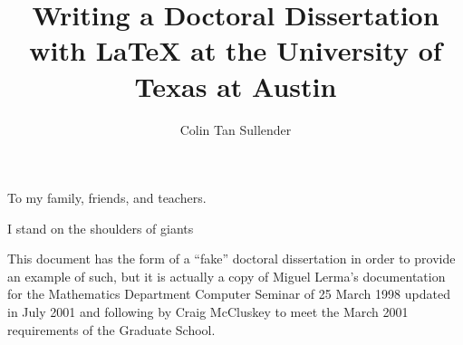 \documentclass[12pt]{report}
\author{Colin Tan Sullender}
\title{Writing a Doctoral Dissertation with \LaTeX{} at the University of Texas at Austin}
\begin{document}
\copyrightpage      %
\commcertpage       %
\titlepage          %


\begin{dedication}
To my family, friends, and teachers.
\end{dedication}


\begin{acknowledgments}
I stand on the shoulders of giants
\end{acknowledgments}


\utabstract
\indent
This document has the form of a ``fake'' doctoral dissertation in order to provide an example of such, but it is actually a
copy of Miguel Lerma's documentation for the Mathematics Department Computer Seminar of 25 March 1998 updated in July 2001
and following by Craig McCluskey to meet the March 2001 requirements of the Graduate School.


\tableofcontents
\listoftables
\listoffigures










\appendices




\end{document}
